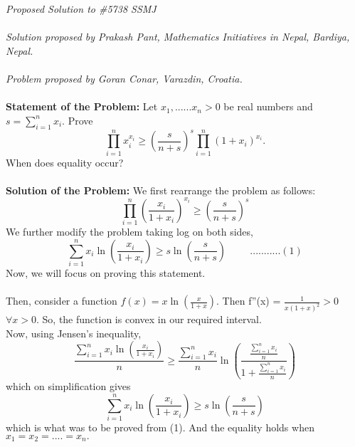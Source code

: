 \documentclass[12pt]{article}
\begin{document}
\textit{Proposed Solution to \#5738 SSMJ }\\ \\
\textit{Solution proposed by Prakash Pant, Mathematics Initiatives in Nepal, Bardiya, Nepal.}\\ \\
\textit{Problem proposed by Goran Conar, Varazdin, Croatia.} \\ \\
\textbf{Statement of the Problem:}
 Let $x_1,......x_n >0 $  be real numbers and $s = \sum_{i=1}^{n} x_i $. Prove \\
\[ \prod_{i=1}^{n} x_i^{x_i} \ge  (\frac{s}{n+s})^s \prod_{i=1}^{n} {(1+x_i)}^{x_i}.	\]
When does equality occur? \\ \\ 

\textbf{Solution of the Problem:}
We first rearrange the problem as follows:\\
\[ \prod_{i=1}^{n} (\frac{x_i}{1+x_i})^{x_i}\ge  (\frac{s}{n+s})^s  					\]
We further modify the problem taking log on both sides, \\
\[ \sum_{i=1}^{n} x_i \ln(\frac{x_i}{1+x_i})	\ge s \ln(\frac{s}{n+s}) \hspace{1cm} ...........(1)				\]
Now, we will focus on proving this statement. \\ \\ 
Then, consider a function $ f(x) = x \ln (\frac{x}{1+x})$. Then f''(x) = $\frac{1}{x(1+x)^2}>0$ $\forall x>0 $. So, the function is convex in our required interval. \\
Now, using Jensen's inequality,\\
\[	\frac{\sum_{i=1}^{n} x_i \ln(\frac{x_i}{1+x_i})}{n}	\ge \frac{\sum_{i=1}^{n} x_i}{n} 
\ln(\frac{ \frac{\sum_{i=1}^{n} x_i}{n}}{1 + \frac{\sum_{i=1}^{n} x_i}{n}} )						\]		
which on simplification gives
\[	\sum_{i=1}^{n} x_i \ln(\frac{x_i}{1+x_i})\ge s
\ln(\frac{s}{n+s} )						\]	
which is what was to be proved from (1). And the equality holds when $ x_1 = x_2 = ....=x_n .$
					
\end{document}
